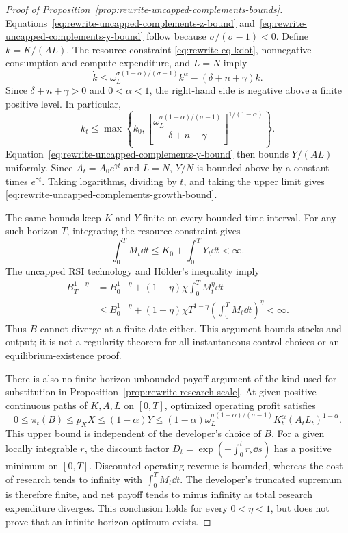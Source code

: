 \begin{proof}[Proof of Proposition~\ref{prop:rewrite-uncapped-complements-bounds}]
\label{proof:rewrite-uncapped-complements-bounds}
Equations~\eqref{eq:rewrite-uncapped-complements-z-bound}
and~\eqref{eq:rewrite-uncapped-complements-y-bound} follow because
$\sigma/(\sigma-1)<0$. Define $k=K/(AL)$. The resource constraint
\eqref{eq:rewrite-eq-kdot}, nonnegative consumption and compute expenditure,
and $L=N$ imply
\begin{equation}
 \dot k\leq
 \omega_L^{\sigma(1-\alpha)/(\sigma-1)}k^\alpha
 -(\delta+n+\gamma)k.
 \label{eq:rewrite-uncapped-complements-k-bound}
\end{equation}
Since $\delta+n+\gamma>0$ and $0<\alpha<1$, the right-hand side is
negative above a finite positive level. In particular,
\[
 k_t\leq
 \max\left\{k_0,
 \left[\frac{\omega_L^{\sigma(1-\alpha)/(\sigma-1)}}
 {\delta+n+\gamma}\right]^{1/(1-\alpha)}\right\}.
\]
Equation~\eqref{eq:rewrite-uncapped-complements-y-bound} then bounds
$Y/(AL)$ uniformly. Since $A_t=A_0e^{\gamma t}$ and $L=N$,
$Y/N$ is bounded above by a constant times $e^{\gamma t}$.
Taking logarithms, dividing by $t$, and taking the upper limit gives
\eqref{eq:rewrite-uncapped-complements-growth-bound}.

The same bounds keep $K$ and $Y$ finite on every bounded time interval.
For any such horizon $T$, integrating the resource constraint gives
\[
 \int_0^T M_t\dd t\leq K_0+\int_0^T Y_t\dd t<\infty.
\]
The uncapped RSI technology and H\"older's inequality imply
\begin{align}
 B_T^{1-\eta}
 &=B_0^{1-\eta}+(1-\eta)\chi\int_0^T M_t^\eta\dd t
 \nonumber\\
 &\leq B_0^{1-\eta}
 +(1-\eta)\chi T^{1-\eta}
 \left(\int_0^T M_t\dd t\right)^\eta<\infty.
 \label{eq:rewrite-uncapped-complements-b-bound}
\end{align}
Thus $B$ cannot diverge at a finite date either. This argument bounds
stocks and output; it is not a regularity theorem for all instantaneous
control choices or an equilibrium-existence proof.

There is also no finite-horizon unbounded-payoff argument of the kind used
for substitution in Proposition~\ref{prop:rewrite-research-scale}.
At given positive continuous paths of $K,A,L$ on $[0,T]$, optimized operating
profit satisfies
\[
 0\leq\pi_t(B)\leq p_XX\leq(1-\alpha)Y
 \leq(1-\alpha)\omega_L^{\sigma(1-\alpha)/(\sigma-1)}
 K_t^\alpha(A_tL_t)^{1-\alpha}.
\]
This upper bound is independent of the developer's choice of $B$.
For a given locally integrable $r$, the discount factor
$D_t=\exp(-\int_0^t r_s\dd s)$ has a positive minimum on $[0,T]$.
Discounted operating revenue is bounded, whereas the cost of research
tends to infinity with $\int_0^T M_t\dd t$. The developer's truncated
supremum is therefore finite, and net payoff tends to minus infinity as
total research expenditure diverges. This conclusion holds for every
$0<\eta<1$, but does not prove that an infinite-horizon optimum exists.
\end{proof}

